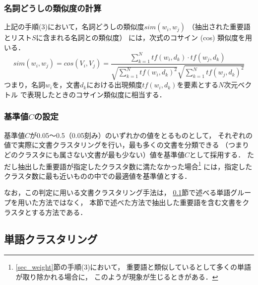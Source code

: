 \documentclass[japanese]{jnlp_1.4}
\begin{document}
\subsubsection{名詞どうしの類似度の計算}\label{subsubsec:cosine}

上記の手順(3)において，名詞どうしの類似度$sim(w_i,w_j)$
（抽出された重要語とリスト$S$に含まれる名詞との類似度）
には，次式のコサイン (cos) 類似度を用いる．
\begin{equation}
sim(w_i,w_j) = cos(V_{i},V_{j}) = 
\frac{\sum_{k=1}^{N} {tf(w_i,d_k) \cdot tf(w_j,d_k)}}
{\sqrt{\sum_{k=1}^{N} tf(w_i,d_k)^2} \sqrt{\sum_{k=1}^{N} tf(w_j,d_k)^2}} \label{eqn:cosine}
\end{equation}
つまり，名詞$w_i$を，文書$d_k$における出現頻度$tf(w_i,d_k)$を要素とする$N$次元ベクトル
で表現したときのコサイン類似度に相当する．


\subsubsection{基準値$C$の設定}\label{subsubsec:threshold}

基準値$C$が0.05〜0.5（0.05刻み）のいずれかの値をとるものとして，
それぞれの値で実際に文書クラスタリングを行い，最も多くの文書を分類できる
（つまりどのクラスタにも属さない文書が最も少ない）値を基準値$C$として採用する．
ただし抽出した重要語が指定したクラスタ数に満たなかった場合\footnote{
  \ref{sec_weight}節の手順(3)において，
  重要語と類似しているとして多くの単語が取り除かれる場合に，
  このようが現象が生じるときがある．}
には，指定したクラスタ数に最も近いものの中での最適値を基準値とする．

なお，この判定に用いる文書クラスタリング手法は，
\ref{subsec:word_clustering}節で述べる単語グループを用いた方法ではなく，
本節で述べた方法で抽出した重要語を含む文書をクラスタとする方法である．


\subsection{単語クラスタリング} \label{subsec:word_clustering}
\end{document}
